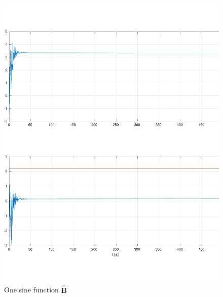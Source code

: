 \documentclass[]{article}
\begin{document}
\begin{figure}[H]
\centering
\includegraphics[width=1\columnwidth]{one_sine_B.pdf}
\caption{One sine function $\mathbf{\hat B}$}
\label{fig:one_sine_B}
\end{figure}
\end{document}
